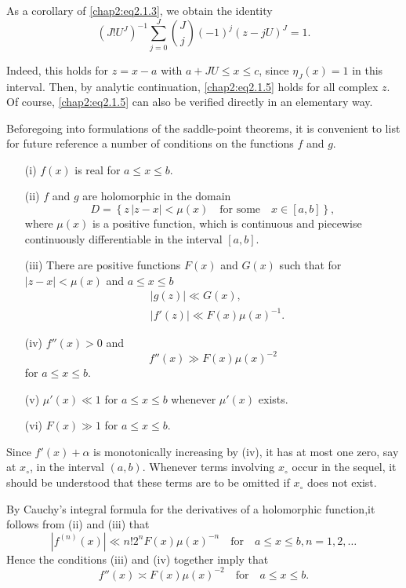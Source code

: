 \begin{remark*}
As a corollary of \eqref{chap2:eq2.1.3}, we obtain the identity
\begin{equation}\label{chap2:eq2.1.5}
\left(J!U^J\right)^{-1}\sum\limits_{j=0}^J\binom{J}{j}(-1)^j(z-jU)^J=1.
\end{equation}
\end{remark*}

Indeed, this holds for $z=x-a$ with $a+JU\leq x\leq c$, since
$\eta_J(x)=1$ in this interval. Then, by analytic continuation,
\eqref{chap2:eq2.1.5} holds for all complex $z$. Of course,
\eqref{chap2:eq2.1.5} can also be verified directly in an elementary
way. 

Before\pageoriginale going into formulations of the saddle-point
theorems, it is convenient to list for future reference a number of
conditions on the functions $f$ and $g$.
\begin{itemize}
\item [(i)] $f(x)$ is real for $a\leq x\leq b$.
\item [(ii)] $f$ and $g$ are holomorphic in the domain
  $$
  D=\left\{z\, \big|z-x\big|<\mu(x)\quad\text{for some}\quad
  x\in[a,b]\right\}, 
  $$
  where $\mu(x)$ is a positive function, which is continuous and
  piecewise continuously differentiable in the interval $[a,b]$.
\item [(iii)] There are positive functions $F(x)$ and $G(x)$ such that
  for $|z-x|<\mu(x)$ and $a\leq x\leq b$
  \begin{align*}
    & \left|g(z)\right|\ll G(x),\\
    & \left|f'(z)\right|\ll F(x)\mu(x)^{-1}.
  \end{align*}
\item [(iv)] $f''(x)>0$ and 
  $$
  f''(x)\gg F(x)\mu(x)^{-2}
  $$
  for $a\leq x\leq b$.
\item [(v)] $\mu'(x)\ll 1$ for $a\leq x\leq b$ whenever $\mu'(x)$
  exists.
\item [(vi)] $F(x)\gg 1$ for $a\leq x\leq b$.
\end{itemize}

Since $f'(x)+\alpha$ is monotonically increasing by (iv), it has at
most one zero, say at $x_\circ$, in the interval $(a,b)$. Whenever
terms involving $x_\circ$ occur in the sequel, it should be understood
that these terms are to be omitted if $x_\circ$ does not exist.
\begin{remark*}
By Cauchy's integral formula for the derivatives of a holomorphic
function,\pageoriginale it follows from (ii) and (iii) that 
\begin{equation}\label{chap2:eq2.1.6}
\left|f^{(n)}(x)\right|\ll n!2^nF(x)\mu(x)^{-n}\quad\text{for} \quad
a\leq x\leq b, n=1, 2,\ldots
\end{equation}
Hence the conditions (iii) and (iv) together imply that
\begin{equation}\label{chap2:eq2.1.7}
f''(x)\asymp F(x)\mu(x)^{-2}\quad\text{for}\quad a\leq x\leq b. 
\end{equation}
\end{remark*}

